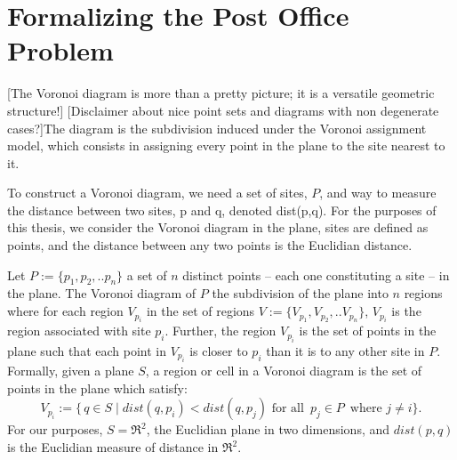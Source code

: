 \documentclass[12pt,twoside]{reedthesis}
\begin{document}
  \section{Formalizing the Post Office Problem} %
  \label{sec:formalizing_the_post_office_problem}
  [The Voronoi diagram is more than a pretty picture; it is a versatile geometric structure!] [Disclaimer about nice point sets and diagrams with non degenerate cases?]The diagram is the subdivision induced under the Voronoi assignment model, which consists in assigning every point in the plane to the site nearest to it.\par
  To construct a Voronoi diagram, we need a set of sites, $P$, and way to measure the distance between two sites, p and q, denoted dist(p,q). For the purposes of this thesis, we consider the Voronoi diagram in the plane, sites are defined as points, and the distance between any two points is the Euclidian distance.\par
  Let $P:=\{p_{1}, p_{2}, .. p_{n}\}$ a set of $n$ distinct points -- each one constituting a site -- in the plane. The Voronoi diagram of $P$ the subdivision of the plane into $n$ regions where for each region $V_{p_{i}}$ in the set of regions $V:=\{V_{p_{1}}, V_{p_{2}}, .. V_{p_{n}}\}$, $V_{p_{i}}$ is the region associated with site $p_{i}$. Further, the region $V_{p_{i}}$ is the set of points in the plane such that each point in $V_{p_{i}}$ is closer to $p_{i}$ than it is to any other site in $P$. Formally, given a plane $S$, a region or cell in a Voronoi diagram is the set of points in the plane which satisfy:
  $$V_{p_{i}} := \{\,q \in S \mid dist(q, p_{i}) < dist(q, p_{j}) \text{ for all }\, p_{j}\in P\,\text{ where }j\neq i \}.$$
  For our purposes, $S= \Re^2$, the Euclidian plane in two dimensions, and $dist(p, q)$ is the Euclidian measure of distance in $\Re^2$. \par
\end{document}
